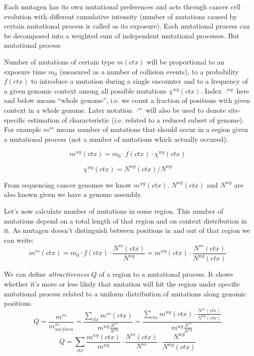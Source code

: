 \documentclass[a4paper]{article}
\begin{document}
Each mutagen has its own mutational preferences and acts through cancer cell evolution with different cumulative intensity (number of mutations caused by certain mutational process is called as its exposure). Each mutational process can be decomposed into a weighted sum of independent mutational processes. But mutational process 


Number of mutations of certain type $m(ctx)$ will be proportional to an exposure time $m_0$ (measured as a number of collision events), to a probability $f(ctx)$ to introduce a mutation during a single encounter and to a frequency of a given genomic context among all possible mutations $\chi^{wg}(ctx)$. Index $\cdot^{wg}$ here and below means ``whole genome'', i.e. we count a fraction of positions with given context in a whole genome. Later notation $\cdot^{ss}$ will also be used to denote site-specific estimation of characteristic (i.e. related to a reduced subset of genome). For example $m^{ss}$ means number of mutations that should occur in a region given a mutational process (not a number of mutations which actually occured).

\begin{equation}
	m^{wg}(ctx) = m_0 \cdot f(ctx) \cdot \chi^{wg}(ctx)
\end{equation}

\begin{equation}
	\chi^{wg}(ctx) = N^{wg}(ctx)/N^{wg}
\end{equation}

From sequencing cancer genomes we know $m^{wg}(ctx)$. $N^{wg}(ctx)$ and $N^{wg}$ are also known given we have a genome assembly.

Let's now calculate number of mutations in some region. This number of mutations depend on a total length of that region and on context distribution in it. As mutagen doesn't distinguish between positions in and out of that region we can write:
\begin{equation}
	m^{ss}(ctx) = m_0 \cdot f(ctx) \cdot \frac{N^{ss}(ctx)}{N^{wg}} = m^{wg}(ctx)\cdot \frac{N^{ss}(ctx)}{N^{wg}(ctx)}
\end{equation}

We can define \textit{attractiveness} $Q$ of a region to a mutational process. It shows whether it's more or less likely that mutation will hit the region under specific mutational process related to a uniform distribution of mutations along genomic positions.
\begin{equation}
	Q = \frac{m^{ss}}{m^{ss}_{uniform}} = \frac{\sum_{ctx} m^{ss}(ctx)}{m^{wg}\frac{N^{ss}}{N^{wg}}} = \frac{\sum_{ctx} m^{wg}(ctx)\cdot \frac{N^{ss}(ctx)}{N^{wg}(ctx)}}{m^{wg}\frac{N^{ss}}{N^{wg}}}
\end{equation}
\begin{equation}
	Q = \sum_{ctx}\frac{ m^{wg}(ctx) }{m^{wg}} \cdot \frac{N^{ss}(ctx)}{N^{ss}} \cdot \frac{N^{wg}}{N^{wg}(ctx)}
\end{equation}
\end{document}
